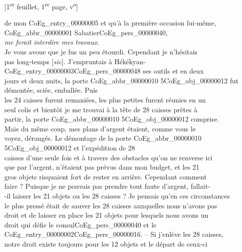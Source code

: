 \documentclass{book}
\begin{document}
{\footnotesize\begin{center} {[1\textsuperscript{er} feuillet, 1\textsuperscript{re} page, v\textsuperscript{o}]}\end{center}}
\noindent de mon \gls{CoEg_entry_00000005} et qu’à la première occasion lui-même, \gls{CoEg_abbr_00000001} Sabatier\gls{CoEg_pers_00000040},\\
\textit{me ferait interdire mes travaux.}\\
\indent Je vous avoue que je fus un peu étourdi. Cependant je n’hésitais\\
pas long-temps [\textit{sic}]. J’empruntais à Hékékyan-\gls{CoEg_entry_00000003}\gls{CoEg_pers_00000048} ses outils et en deux\\
jours et deux nuits, la porte \gls{CoEg_abbr_00000010} 5\gls{CoEg_obj_00000012} fut démontée, sciée, emballée. Puis\\
les 24 caisses furent remaniées, les plus petites furent réunies en un\\
seul colis et bientôt je me trouvai à la tête de 28 caisses prêtes à\\
partir, la porte \gls{CoEg_abbr_00000010} 5\gls{CoEg_obj_00000012} comprise.\\
\indent Mais du même coup, mes plans d’argent étaient, comme vous le\\
voyez, dérangés. Le démontage de la porte \gls{CoEg_abbr_00000010} 5\gls{CoEg_obj_00000012} et l’expédition de 28\\
caisses d’une seule fois et à travers des obstacles qu’on ne renverse ici\\
que par l’argent, n’étaient pas prévus dans mon budget, et les 21\\
gros objets risquaient fort de rester en arrière. Cependant comment\\
faire ? Puisque je ne pouvais pas prendre tout faute d’argent, fallait-\\
-il laisser les 21 objets ou les 28 caisses ? Je pensais qu’en ces circonstances\\
le plus pressé était de sauver les 28 caisses auxquelles nous n’avons pas\\
droit et de laisser en place les 21 objets pour lesquels nous avons un\\
droit qui défie le consul\gls{CoEg_pers_00000040} et le \Gls{CoEg_entry_00000002}\gls{CoEg_pers_00000016}. – Si j’enlève les 28 caisses,\\
notre droit existe toujours pour les 12 objets et le départ de ceux-ci\\
\end{document}
